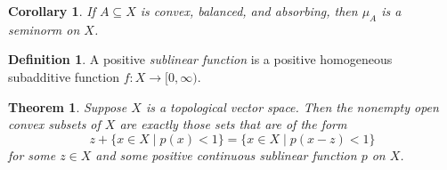 \documentclass[a4paper,12pt]{article}
\theoremstyle{definition}
\newtheorem{definition}{Definition}
\theoremstyle{plain}
\newtheorem{theorem}{Theorem}
\newtheorem{corollary}{Corollary}
\theoremstyle{remark}
\begin{document}
\begin{corollary}
    If \(A \subseteq X\) is convex, balanced, and absorbing, then \(\mu_A\) is a seminorm on \(X\).
\end{corollary}

\begin{definition}
    A positive \emph{sublinear function} is a positive homogeneous subadditive function \(f:X \to [0,\infty)\).
\end{definition}

\begin{theorem}
    Suppose \(X\) is a topological vector space. Then the nonempty open convex subsets of \(X\) are exactly those sets that are of the form
    \[z + \{x \in X \mid p(x)<1\}=\{x\in X \mid p(x-z)<1\}\] for some \(z \in X\) and some positive continuous sublinear function \(p\) on \(X\).
\end{theorem}
\end{document}
